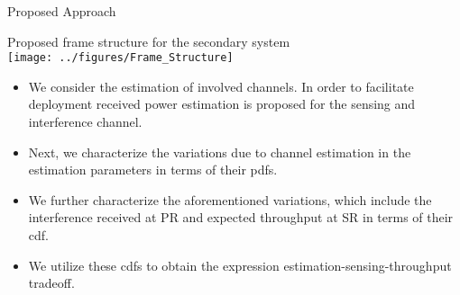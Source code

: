 \documentclass[12pt]{beamer}
\newcommand{\fs}[2]{\fontsize{#1 pt}{#2}\selectfont}
\begin{document}
\begin{frame}{Proposed Approach}
        \begin{overlayarea}{\textwidth}{4.4cm}
        \begin{center}
		\fs{8}{8}
		Proposed frame structure for the secondary system \\
        	\vspace{0.4cm}
                \texttt{[image: ../figures/Frame\_Structure]}
	\end{center}
	\end{overlayarea}
	\fs{8}{8}
	\begin{itemize}
	\item We consider the estimation of involved channels. In order to facilitate deployment received power estimation is proposed for the sensing and interference channel. 
	\item Next, we characterize the variations due to channel estimation in the estimation parameters in terms of their pdfs.
	\item We further characterize the aforementioned variations, which include the interference received at PR and expected throughput at SR in terms of their cdf.
	\item We utilize these cdfs to obtain the expression estimation-sensing-throughput tradeoff. 
	\end{itemize}	
\end{frame}
\end{document}
